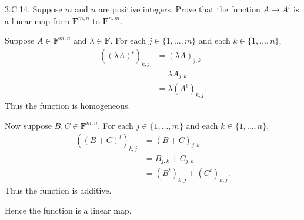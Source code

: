 \documentclass[a5paper]{article}
\begin{document}
\newcommand   \C           {\mathbf{C}}
\newcommand   \R           {\mathbf{R}}
\renewcommand \L           {\mathcal{L}}
\newcommand   \F           {\mathbf{F}}
\renewcommand \P           {\mathcal{P}}
\newcommand   \M           {\mathcal{M}}
\newcommand   \op          {\operatorname}


    3.C.14.
    Suppose $m$ and $n$ are positive integers.
    Prove that the function $A \rightarrow A^t$ is a linear map from $\F^{m,n}$ to $\F^{n,m}$.


    Suppose $A \in \F^{m,n}$ and $\lambda \in \F$.
    For each $j \in \{1,\dots,m\}$ and each $k \in \{1,\dots,n\}$,
\begin{align*}
        ((\lambda A)^t)_{k,j} &= (\lambda A)_{j,k} \\
                              &= \lambda A_{j,k} \\
                              &= \lambda (A^t)_{k,j} .
\end{align*}
    Thus the function is homogeneous.

    Now suppose $B, C \in \F^{m,n}$.
    For each $j \in \{1,\dots,m\}$ and each $k \in \{1,\dots,n\}$,
\begin{align*}
        ((B+C)^t)_{k,j} &= (B+C)_{j,k} \\
                        &= B_{j,k} + C_{j,k} \\
                        &= (B^t)_{k,j} + (C^t)_{k,j} .
\end{align*}
    Thus the function is additive.

    Hence the function is a linear map.
\end{document}
